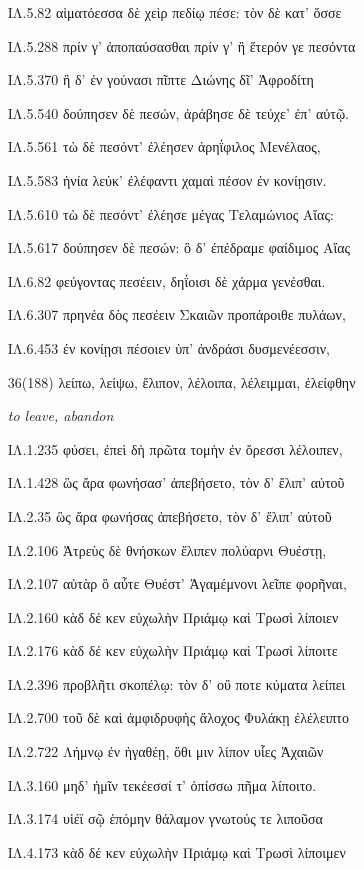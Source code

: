 \begin{enumerate}
{ΙΛ.5.82 αἱματόεσσα δὲ χεὶρ πεδίῳ πέσε: τὸν δὲ κατ' ὄσσε

ΙΛ.5.288 πρίν γ' ἀποπαύσασθαι πρίν γ' ἢ ἕτερόν γε πεσόντα

ΙΛ.5.370 ἣ δ' ἐν γούνασι πῖπτε Διώνης δῖ' Ἀφροδίτη

ΙΛ.5.540 δούπησεν δὲ πεσών, ἀράβησε δὲ τεύχε' ἐπ' αὐτῷ.

ΙΛ.5.561 τὼ δὲ πεσόντ' ἐλέησεν ἀρηΐφιλος Μενέλαος,

ΙΛ.5.583 ἡνία λεύκ' ἐλέφαντι χαμαὶ πέσον ἐν κονίῃσιν.

ΙΛ.5.610 τὼ δὲ πεσόντ' ἐλέησε μέγας Τελαμώνιος Αἴας:

ΙΛ.5.617 δούπησεν δὲ πεσών: ὃ δ' ἐπέδραμε φαίδιμος Αἴας

ΙΛ.6.82 φεύγοντας πεσέειν, δηΐοισι δὲ χάρμα γενέσθαι.

ΙΛ.6.307 πρηνέα δὸς πεσέειν Σκαιῶν προπάροιθε πυλάων,

ΙΛ.6.453 ἐν κονίῃσι πέσοιεν ὑπ' ἀνδράσι δυσμενέεσσιν,

}

\clearpage
\item[\large 36(188)]{\large \g      λείπω, λείψω, ἔλιπον, λέλοιπα, λέλειμμαι, ἐλείφθην}

\hspace{0.2cm} \textit{  to leave, abandon }

{\g
ΙΛ.1.235 φύσει, ἐπεὶ δὴ πρῶτα τομὴν ἐν ὄρεσσι λέλοιπεν,

ΙΛ.1.428 ὣς ἄρα φωνήσασ' ἀπεβήσετο, τὸν δ' ἔλιπ' αὐτοῦ

ΙΛ.2.35 ὣς ἄρα φωνήσας ἀπεβήσετο, τὸν δ' ἔλιπ' αὐτοῦ

ΙΛ.2.106 Ἀτρεὺς δὲ θνήσκων ἔλιπεν πολύαρνι Θυέστῃ,

ΙΛ.2.107 αὐτὰρ ὃ αὖτε Θυέστ' Ἀγαμέμνονι λεῖπε φορῆναι,

ΙΛ.2.160 κὰδ δέ κεν εὐχωλὴν Πριάμῳ καὶ Τρωσὶ λίποιεν

ΙΛ.2.176 κὰδ δέ κεν εὐχωλὴν Πριάμῳ καὶ Τρωσὶ λίποιτε

ΙΛ.2.396 προβλῆτι σκοπέλῳ: τὸν δ' οὔ ποτε κύματα λείπει

ΙΛ.2.700 τοῦ δὲ καὶ ἀμφιδρυφὴς ἄλοχος Φυλάκῃ ἐλέλειπτο

ΙΛ.2.722 Λήμνῳ ἐν ἠγαθέῃ, ὅθι μιν λίπον υἷες Ἀχαιῶν

ΙΛ.3.160 μηδ' ἡμῖν τεκέεσσί τ' ὀπίσσω πῆμα λίποιτο.

ΙΛ.3.174 υἱέϊ σῷ ἑπόμην θάλαμον γνωτούς τε λιποῦσα

ΙΛ.4.173 κὰδ δέ κεν εὐχωλὴν Πριάμῳ καὶ Τρωσὶ λίποιμεν

}
\end{enumerate}
